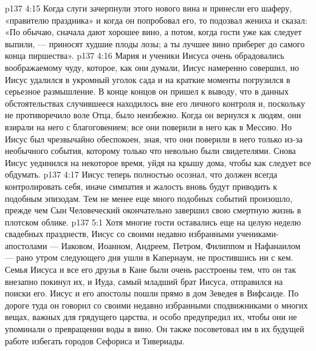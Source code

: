 \vs p137 4:15 \pc Когда слуги зачерпнули этого нового вина и принесли его шаферу, «правителю праздника» и когда он попробовал его, то подозвал жениха и сказал: «По обычаю, сначала дают хорошее вино, а потом, когда гости уже как следует выпили, --- приносят худшие плоды лозы; а ты лучшее вино приберег до самого конца пиршества».
\vs p137 4:16 Мария и ученики Иисуса очень обрадовались воображаемому чуду, которое, как они думали, Иисус намеренно совершил, но Иисус удалился в укромный уголок сада и на краткие моменты погрузился в серьезное размышление. В конце концов он пришел к выводу, что в данных обстоятельствах случившееся находилось вне его личного контроля и, поскольку не противоречило воле Отца, было неизбежно. Когда он вернулся к людям, они взирали на него с благоговением; все они поверили в него как в Мессию. Но Иисус был чрезвычайно обеспокоен, зная, что они поверили в него только из\hyp{}за необычного события, которому только что невольно были свидетелями. Снова Иисус уединился на некоторое время, уйдя на крышу дома, чтобы как следует все обдумать.
\vs p137 4:17 Иисус теперь полностью осознал, что должен всегда контролировать себя, иначе симпатия и жалость вновь будут приводить к подобным эпизодам. Тем не менее еще много подобных событий произошло, прежде чем Сын Человеческий окончательно завершил свою смертную жизнь в плотском облике.
\vs p137 5:1 Хотя многие гости оставались еще на целую неделю свадебных празднеств, Иисус со своими недавно избранными учениками\hyp{}апостолами --- Иаковом, Иоанном, Андреем, Петром, Филиппом и Нафанаилом --- рано утром следующего дня ушли в Капернаум, не простившись ни с кем. Семья Иисуса и все его друзья в Кане были очень расстроены тем, что он так внезапно покинул их, и Иуда, самый младший брат Иисуса, отправился на поиски его. Иисус и его апостолы пошли прямо в дом Зеведея в Вифсаиде. По дороге туда он говорил со своими недавно избранными сподвижниками о многих вещах, важных для грядущего царства, и особо предупредил их, чтобы они не упоминали о превращении воды в вино. Он также посоветовал им в их будущей работе избегать городов Сефориса и Тивериады.
